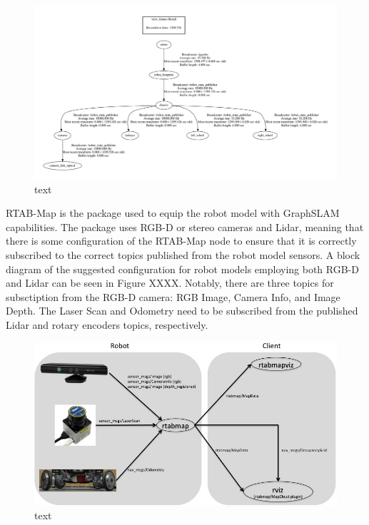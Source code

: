 \documentclass[a4paper]{article}
\begin{document}
\clearpage

\begin{figure}
	\centering
	\includegraphics[scale=0.5]{frames}
	\caption{text}
\end{figure}

\clearpage

RTAB-Map is the package used to equip the robot model with GraphSLAM capabilities. The package uses RGB-D or stereo cameras and Lidar, meaning that there is some configuration of the RTAB-Map node to ensure that it is correctly subscribed to the correct topics published from the robot model sensors. A block diagram of the suggested configuration for robot models employing both RGB-D and Lidar can be seen in Figure XXXX. Notably, there are three topics for subsctiption from the RGB-D camera: RGB Image, Camera Info, and Image Depth. The Laser Scan and Odometry need to be subscribed from the published Lidar and rotary encoders topics, respectively.

\begin{figure}[h]
	\centering
	\includegraphics[scale=0.5]{rtabmap_setup}
	\caption{text}
\end{figure}
\end{document}
